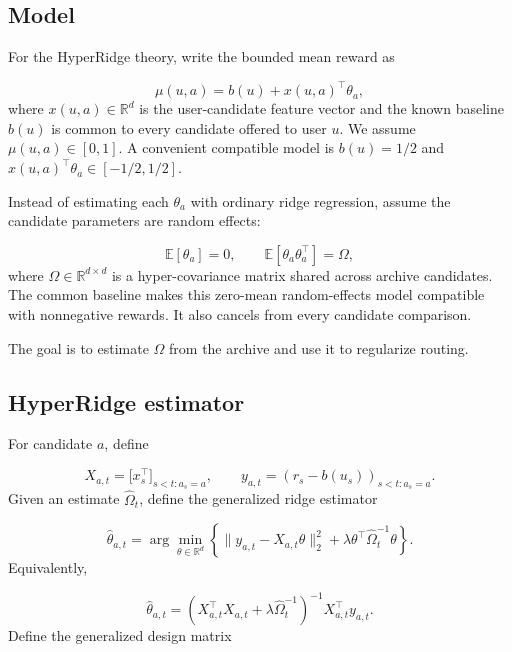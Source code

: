 \documentclass{article} %
\begin{document}
\subsection{Model}
\label{sec:method-model}

For the HyperRidge theory, write the bounded mean reward as

\begin{equation}
\mu(u,a)=b(u)+x(u,a)^\top\theta_a ,
\end{equation}
where $x(u,a)\in\mathbb{R}^d$ is the user-candidate feature vector and the known baseline $b(u)$ is common to every candidate offered to user $u$. We assume $\mu(u,a)\in[0,1]$. A convenient compatible model is $b(u)=1/2$ and $x(u,a)^\top\theta_a\in[-1/2,1/2]$.

Instead of estimating each $\theta_a$ with ordinary ridge regression, assume
the candidate parameters are random effects:

\begin{equation}
\mathbb{E}[\theta_a]=0,\qquad
\mathbb{E}[\theta_a\theta_a^\top]=\Omega,
\end{equation}
where $\Omega \in \mathbb{R}^{d \times d}$ is a hyper-covariance matrix shared
across archive candidates. The common baseline makes this zero-mean random-effects model compatible with nonnegative rewards. It also cancels from every candidate comparison.

The goal is to estimate $\Omega$ from the archive and use it to regularize
routing.

\subsection{HyperRidge estimator}

For candidate $a$, define

\begin{equation}
X_{a,t} = \bigl[ x_s^\top \bigr]_{s < t : a_s = a}, \qquad
y_{a,t} = (r_s-b(u_s))_{s < t : a_s = a}.
\end{equation}
Given an estimate $\widehat{\Omega}_t$, define the generalized ridge estimator

\begin{equation}
\widehat{\theta}_{a,t}
= \arg\min_{\theta \in \mathbb{R}^d}
\left\{ \| y_{a,t} - X_{a,t}\theta \|_2^2
      + \lambda \theta^\top \widehat{\Omega}_t^{-1} \theta \right\}.
\end{equation}
Equivalently,

\begin{equation}
\label{eq:hyper-theta-hat}
\widehat{\theta}_{a,t}
= \left( X_{a,t}^\top X_{a,t} + \lambda \widehat{\Omega}_t^{-1} \right)^{-1}
  X_{a,t}^\top y_{a,t}.
\end{equation}
Define the generalized design matrix
\end{document}

